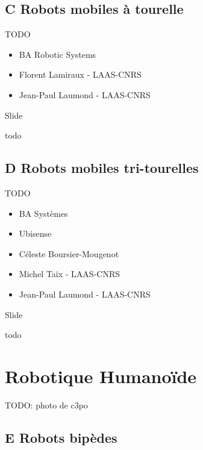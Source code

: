 \documentclass[french,ignorenonframetext,]{beamer}
\providecommand{\tightlist}{%
  \setlength{\itemsep}{0pt}\setlength{\parskip}{0pt}}
\begin{document}
\subsection{C Robots mobiles à
tourelle}\label{c-robots-mobiles-uxe0-tourelle}

TODO

\begin{itemize}
\tightlist
\item
  BA Robotic Systems
\item
  Florent Lamiraux - LAAS-CNRS
\item
  Jean-Paul Laumond - LAAS-CNRS
\end{itemize}

\begin{frame}{Slide}

todo

\end{frame}

\subsection{D Robots mobiles
tri-tourelles}\label{d-robots-mobiles-tri-tourelles}

TODO

\begin{itemize}
\tightlist
\item
  BA Systèmes
\item
  Ubisense
\item
  Céleste Boursier-Mougenot
\item
  Michel Taïx - LAAS-CNRS
\item
  Jean-Paul Laumond - LAAS-CNRS
\end{itemize}

\begin{frame}{Slide}

todo

\end{frame}

\section{Robotique Humanoïde}\label{robotique-humanouxefde}

TODO: photo de c3po

\subsection{E Robots bipèdes}\label{e-robots-bipuxe8des}
\end{document}

